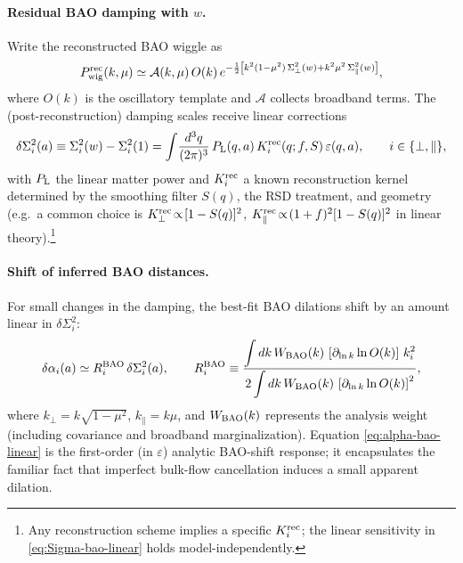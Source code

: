 \documentclass[11pt]{article}
\begin{document}
\paragraph{Residual BAO damping with $w$.}
Write the reconstructed BAO wiggle as
\begin{equation}
P_{\rm wig}^{\rm rec}(k,\mu)\simeq
\mathcal{A}(k,\mu)\,O(k)\,e^{-\frac{1}{2}
\left[k^2(1-\mu^2)\,\Sigma_{\perp}^2(w) + k^2\mu^2\,\Sigma_{\parallel}^2(w)\right]},
\end{equation}
where $O(k)$ is the oscillatory template and $\mathcal{A}$ collects broadband terms. The (post-reconstruction) damping scales receive linear corrections
\begin{equation}
\label{eq:Sigma-bao-linear}
\delta\Sigma_{i}^2(a)\equiv\Sigma_{i}^2(w)-\Sigma_{i}^2(1)
=\int\!\frac{d^3q}{(2\pi)^3}\,P_{\rm L}(q,a)\,K^{\rm rec}_{i}(q;f,S)\,\varepsilon(q,a),
\qquad i\in\{\perp,\parallel\},
\end{equation}
with $P_{\rm L}$ the linear matter power and $K^{\rm rec}_{i}$ a known reconstruction kernel determined by the smoothing filter $S(q)$, the RSD treatment, and geometry (e.g.\ a common choice is $K^{\rm rec}_{\perp}\!\propto\![1-S(q)]^2$, $K^{\rm rec}_{\parallel}\!\propto\!(1+f)^2[1-S(q)]^2$ in linear theory).\footnote{Any reconstruction scheme implies a specific $K^{\rm rec}_i$; the linear sensitivity in \eqref{eq:Sigma-bao-linear} holds model-independently.}

\paragraph{Shift of inferred BAO distances.}
For small changes in the damping, the best-fit BAO dilations shift by an amount linear in $\delta\Sigma_i^2$:
\begin{equation}
\label{eq:alpha-bao-linear}
\delta\alpha_i(a)\simeq R^{\rm BAO}_i\,\delta\Sigma_i^2(a),
\qquad
R^{\rm BAO}_i\equiv
\frac{
\displaystyle \int dk\,W_{\rm BAO}(k)\,
\left[\partial_{\ln k}\ln O(k)\right]\,k_i^2
}{
\displaystyle 2\int dk\,W_{\rm BAO}(k)\,
\left[\partial_{\ln k}\ln O(k)\right]^2
},
\end{equation}
where $k_{\perp}=k\sqrt{1-\mu^2}$, $k_{\parallel}=k\mu$, and $W_{\rm BAO}(k)$ represents the analysis weight (including covariance and broadband marginalization). Equation \eqref{eq:alpha-bao-linear} is the first-order (in $\varepsilon$) analytic BAO-shift response; it encapsulates the familiar fact that imperfect bulk-flow cancellation induces a small apparent dilation.
\end{document}
